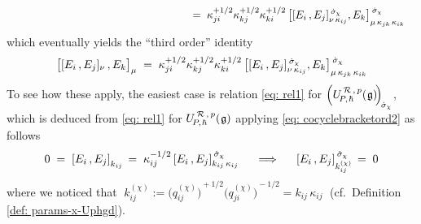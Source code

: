 \documentclass[12pt,reqno,twoside,a4paper]{amsart}
\numberwithin{equation}{section}
\theoremstyle{definition}
\newtheorem{free text}[lema]{}
\theoremstyle{remark}
\newcommand{\R}{{\mathcal R}}
\def \lieg{\mathfrak{g}}
\def \uRpPhg{U^{\,\R\,,\,p}_{\!P,\hskip0,7pt\hbar}(\hskip0,5pt\lieg)}
\newcommand{\sigmachi}{{\raise-1pt\hbox{$ \, \scriptstyle \dot\sigma_\chi $}}}
\theoremstyle{plain}
\begin{document}
\begin{equation}
\begin{aligned}
     &  \hskip169pt   = \; \kappa_{ji}^{+1/2} \kappa_{kj}^{+1/2} \kappa_{ki}^{+1/2} \, {\big[
{[E_i\,,E_j]}_{\nu \, \kappa_{ij}}^\sigmachi , E_k \big]}
_{\mu \, \kappa_{jk} \, \kappa_{ik}}^\sigmachi
%
  \end{aligned}
%
\end{equation}
%
 which eventually yields the ``third order'' identity
%
\begin{equation}  \label{eq: change-cocycle-bracket-ord_3 - sum up}
%
  {\big[[E_i\,,E_j]_\nu \, , E_k\big]}_\mu  \; = \; \kappa_{ji}^{+1/2} \kappa_{kj}^{+1/2} \kappa_{ki}^{+1/2} \, {\big[ {[E_i\,,E_j]}_{\nu \, \kappa_{ij}}^\sigmachi , E_k \big]}
_{\mu \, \kappa_{jk} \, \kappa_{ik}}^\sigmachi
%
\end{equation}
%
   \indent   To see how these apply, the easiest case is relation  \eqref{eq: rel1}  for  $ {\Big( \uRpPhg \!\Big)}_{\!\!\sigmachi} $,  which is deduced from  \eqref{eq: rel1}  for  $ \uRpPhg $  applying  \eqref{eq: cocyclebracketord2}  as follows
%
  $$  0  \; = \;  {[E_i\,,E_j]}_{k_{ij}}  \, = \;  \kappa_{ij}^{-1/2} \, {[E_i\,,E_j]}^\sigmachi_{k_{ij} \, \kappa_{ij}}  \,\;\quad \Longrightarrow \quad\;\,  {[E_i\,,E_j]}^\sigmachi_{k_{ij}^{(\chi)}} \, = \; 0  $$
%
 where we noticed that  $ \; k_{ij}^{(\chi)} := {\big( q_{ij}^{(\chi)} \big)}^{\!+1/2} {\big( q_{ji}^{(\chi)} \big)}^{\!-1/2} = k_{ij} \, \kappa_{ij} \; $  (cf.\ Definition \ref{def: params-x-Uphgd}).
\end{document}

